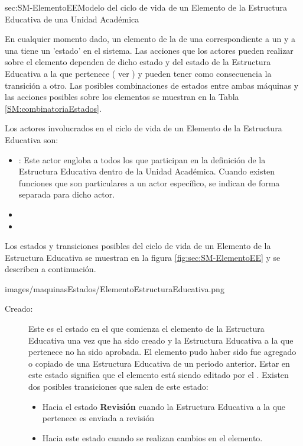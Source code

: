 \begin{Maquina}{sec:SM-ElementoEE}{Modelo del ciclo de vida de un Elemento de la Estructura Educativa de una Unidad Académica} {
En cualquier momento dado, un elemento de la  de una  correspondiente a un  y a una  tiene un 'estado' en el sistema. Las acciones que los actores pueden realizar sobre el elemento dependen de dicho estado y del estado de la Estructura Educativa a la que pertenece ( ver  ) y pueden tener como consecuencia la transición a otro. Las posibles combinaciones de estados entre ambas máquinas y las acciones posibles sobre los elementos se muestran en la Tabla \ref{SM:combinatoriaEstados}.

Los actores involucrados en el ciclo de vida de un Elemento de la Estructura Educativa son:
\begin{itemize} 
	\item {}: Este actor engloba a todos los que participan en la definición de la Estructura Educativa dentro de la Unidad Académica. Cuando existen funciones que son particulares a un actor específico, se indican de forma separada para dicho actor.
	\item {}
	\item {}
\end{itemize}

Los estados y transiciones posibles del ciclo de vida de un Elemento de la Estructura Educativa se muestran en la figura \ref{fig:sec:SM-ElementoEE} y se describen a continuación.	
%
}{images/maquinasEstados/ElementoEstructuraEducativa.png}
\begin{description}

\item[Creado:] Este es el estado en el que comienza el elemento de la Estructura Educativa una vez que ha sido creado y la Estructura Educativa a la que pertenece no ha sido aprobada. El elemento pudo haber sido fue agregado o copiado de una Estructura Educativa de un periodo anterior. Estar en este estado significa que el elemento está siendo editado por el . Existen dos posibles transiciones que salen de este estado:
\begin{itemize} 
	\item Hacia el estado {\bf Revisión} cuando la Estructura Educativa a la que pertenece es enviada a revisión
	\item Hacia este estado cuando se realizan cambios en el elemento.
\end{itemize}


\end{description}
\end{Maquina}
